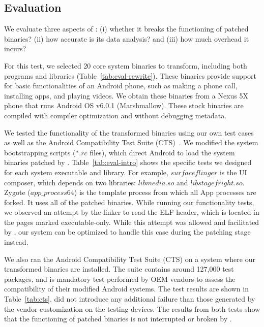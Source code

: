 \subsection{Evaluation}
\label{norax:sec:eval}
We evaluate three aspects of \norax: (i) whether it breaks the functioning of patched binaries? (ii) how accurate is its data analysis? and (iii) how much overhead it incurs?

For this test, we selected 20 core system binaries to transform, including both programs and
libraries (Table~\ref{tab:eval-rewrite}).  These binaries provide support for
basic functionalities of an Android phone, such as making a phone call,
installing apps, and playing videos.  We obtain these binaries from a
Nexus 5X phone that runs Android OS v6.0.1 (Marshmallow). These stock
binaries are compiled with compiler optimization and without debugging metadata. 

We tested the functionality of the transformed binaries using our
own test cases as well as the Android Compatibility Test Suite
(CTS)~\cite{cts}. We modified the system bootstrapping
scripts (\emph{$*.rc$} files), which direct Android to load the system binaries patched by \NORAX. 
Table~\ref{tab:eval-intro} shows the specific tests we designed for
each system executable and library. 
For example,  $surfaceflinger$ is the UI composer, which depends on two libraries:
$libmedia.so$ and $libstagefright.so$. 
Zygote ($app\_process\textit{64}$) is the template process from which all App processes 
are forked. It uses all of the patched binaries.  
While running our functionality tests, we observed an attempt by the
linker to read the ELF header, which is located in the pages
marked executable-only. While this attempt was allowed and facilitated by \NMonitor, our system can
be optimized to handle this case during the patching stage instead. 

We also ran the Android Compatibility Test Suite (CTS) on a system
where our transformed binaries are installed.  The suite contains around 127,000
test packages, and is mandatory test  performed by OEM vendors to assess the compatibility
of their modified Android systems. The test results are shown in Table~\ref{tab:cts}. 
\NORAX did not introduce any additional failure than those generated by the vendor customization on the testing devices. The results from both tests show that the functioning of patched binaries is not interrupted or broken by \NORAX. 

